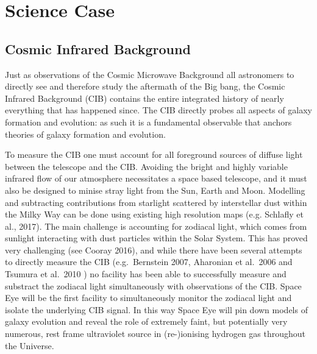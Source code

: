 \documentclass[]{iac}
\begin{document}
\section{Science Case}
\label{sec:aims}

\subsection{Cosmic Infrared Background}

Just as observations of the Cosmic Microwave Background all astronomers to directly see and therefore study the
aftermath of the Big bang, the Cosmic Infrared Background (CIB) contains the entire integrated history of nearly
everything that has happened since. The CIB directly probes all aspects of galaxy formation and evolution:
as such it is a fundamental observable that anchors theories of galaxy formation and evolution.

To measure the CIB one must account for all foreground sources of diffuse light between the
telescope and the CIB. Avoiding the bright and highly variable infrared flow of our atmosphere necessitates a space
based telescope, and it must also be designed to minise stray light from the Sun, Earth and Moon.  Modelling and
subtracting contributions from starlight scattered by interstellar dust within the Milky Way can be done using
existing high resolution maps (e.g. Schlafly et al., 2017\cite{Schlafly2017}). The main challenge is accounting for
zodiacal light, which comes from sunlight interacting with dust particles within the Solar System.  This has proved
very challenging (see Cooray 2016\cite{Cooray2016}), and while there have been several attempts to directly
measure the CIB (e.g.\ Bernstein 2007, Aharonian et al.\ 2006 and Tsumura et al.\ 2010
\cite{Bernstein2007,Aharonian2006,Tsumura2010}) no facility has been able to successfully measure and substract the
zodiacal light simultaneously with observations of the CIB. Space Eye will be the first facility to simultaneously
monitor the zodiacal light and isolate the underlying CIB signal.
In this way Space Eye will pin down models of galaxy evolution and reveal the role of extremely faint, but potentially
very numerous, rest frame ultraviolet source in (re-)ionising hydrogen gas throughout the Universe\cite{Lanz2014}.
\end{document}
